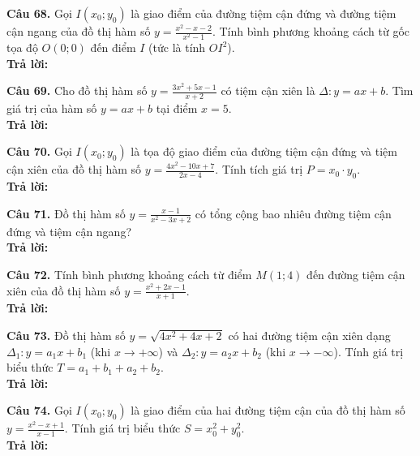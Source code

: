 \documentclass[12pt]{article}
\newcommand{\otraloi}{\underline{\hspace{5cm}}}
\begin{document}
	\vspace{0.6cm}
	\noindent \textbf{Câu 68.} Gọi $I(x_0; y_0)$ là giao điểm của đường tiệm cận đứng và đường tiệm cận ngang của đồ thị hàm số $y = \frac{x^2 - x - 2}{x^2 - 1}$. Tính bình phương khoảng cách từ gốc tọa độ $O(0; 0)$ đến điểm $I$ (tức là tính $OI^2$).
	\\[4pt] \textbf{Trả lời:} \otraloi
	
	\vspace{0.6cm}
	\noindent \textbf{Câu 69.} Cho đồ thị hàm số $y = \frac{3x^2 + 5x - 1}{x + 2}$ có tiệm cận xiên là $\Delta: y = ax + b$. Tìm giá trị của hàm số $y = ax + b$ tại điểm $x = 5$.
	\\[4pt] \textbf{Trả lời:} \otraloi
	
	\vspace{0.6cm}
	\noindent \textbf{Câu 70.} Gọi $I(x_0; y_0)$ là tọa độ giao điểm của đường tiệm cận đứng và tiệm cận xiên của đồ thị hàm số $y = \frac{4x^2 - 10x + 7}{2x - 4}$. Tính tích giá trị $P = x_0 \cdot y_0$.
	\\[4pt] \textbf{Trả lời:} \otraloi
	
	\vspace{0.6cm}
	\noindent \textbf{Câu 71.} Đồ thị hàm số $y = \frac{x - 1}{x^2 - 3x + 2}$ có tổng cộng bao nhiêu đường tiệm cận đứng và tiệm cận ngang?
	\\[4pt] \textbf{Trả lời:} \otraloi
	
	\vspace{0.6cm}
	\noindent \textbf{Câu 72.} Tính bình phương khoảng cách từ điểm $M(1; 4)$ đến đường tiệm cận xiên của đồ thị hàm số $y = \frac{x^2 + 2x - 1}{x + 1}$.
	\\[4pt] \textbf{Trả lời:} \otraloi
	
	\vspace{0.6cm}
	\noindent \textbf{Câu 73.} Đồ thị hàm số $y = \sqrt{4x^2 + 4x + 2}$ có hai đường tiệm cận xiên dạng $\Delta_1: y = a_1x + b_1$ (khi $x \to +\infty$) và $\Delta_2: y = a_2x + b_2$ (khi $x \to -\infty$). Tính giá trị biểu thức $T = a_1 + b_1 + a_2 + b_2$.
	\\[4pt] \textbf{Trả lời:} \otraloi
	
	\vspace{0.6cm}
	\noindent \textbf{Câu 74.} Gọi $I(x_0; y_0)$ là giao điểm của hai đường tiệm cận của đồ thị hàm số $y = \frac{x^2 - x + 1}{x - 1}$. Tính giá trị biểu thức $S = x_0^2 + y_0^2$.
	\\[4pt] \textbf{Trả lời:} \otraloi
	
	
	
\end{document}
